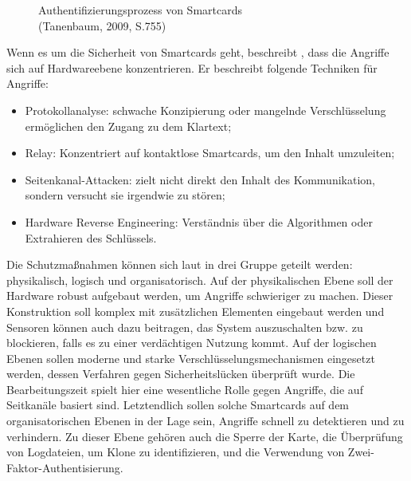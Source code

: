 \begin{figure}[H]
   \caption{Authentifizierungsprozess von Smartcards\\(Tanenbaum, 2009, S.755)}
   \label{fig:refbook_ATMS}
\end{figure}


Wenn es um die Sicherheit von Smartcards geht, beschreibt \cite{refmas:ASSS}, dass die Angriffe sich auf 
Hardwareebene konzentrieren. Er beschreibt folgende Techniken für Angriffe:

\begin{itemize}
    \item Protokollanalyse: schwache Konzipierung oder mangelnde Verschlüsselung ermöglichen den Zugang 
    zu dem Klartext; 
    \item Relay: Konzentriert auf kontaktlose Smartcards, um den Inhalt umzuleiten;
    \item Seitenkanal-Attacken: zielt nicht direkt den Inhalt des Kommunikation, sondern versucht sie
    irgendwie zu stören;
    \item Hardware Reverse Engineering: Verständnis über die Algorithmen oder Extrahieren des Schlüssels.
\end{itemize}


Die Schutzmaßnahmen können sich laut \cite{refmas:ASSS} in drei Gruppe geteilt werden: physikalisch,
logisch und organisatorisch. Auf der physikalischen Ebene soll der Hardware robust aufgebaut werden,
um Angriffe schwieriger zu machen. Dieser Konstruktion soll komplex mit zusätzlichen Elementen eingebaut
werden und Sensoren können auch dazu beitragen, das System auszuschalten bzw. zu blockieren, falls es zu 
einer verdächtigen Nutzung kommt. Auf der logischen Ebenen sollen moderne und starke Verschlüsselungsmechanismen
eingesetzt werden, dessen Verfahren gegen Sicherheitslücken überprüft wurde. Die Bearbeitungszeit spielt hier
eine wesentliche Rolle gegen Angriffe, die auf Seitkanäle basiert sind. Letztendlich sollen solche Smartcards
auf dem organisatorischen Ebenen in der Lage sein, Angriffe schnell zu detektieren und zu verhindern. Zu dieser
Ebene gehören auch die Sperre der Karte, die Überprüfung von Logdateien, um Klone zu identifizieren, und
die Verwendung von Zwei-Faktor-Authentisierung.

